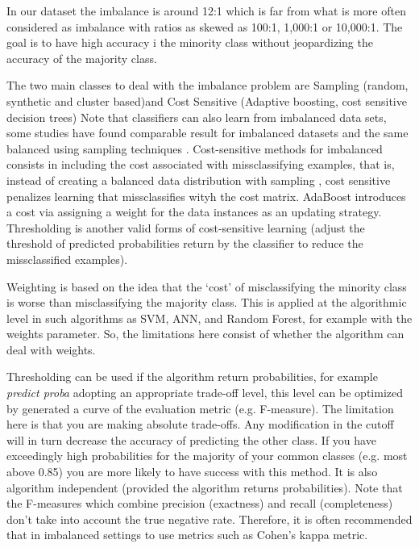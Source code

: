 \documentclass[11pt]{article}
\begin{document}
In our dataset the imbalance is around 12:1 which is far from what is more often considered as imbalance with ratios as skewed as 100:1, 1,000:1 or 10,000:1\cite{he2009learning}.
The goal is to have high accuracy i the minority class without jeopardizing  the accuracy of the majority class.

The two main classes to deal with the imbalance problem are Sampling (random, synthetic and cluster based)and Cost Sensitive (Adaptive boosting, cost sensitive decision trees) 
Note that classifiers can also learn from imbalanced data sets, some studies have found comparable result for imbalanced datasets and the same balanced using sampling techniques \cite{japkowicz2002class}.
Cost-sensitive methods for imbalanced consists in including the cost associated with missclassifying examples, that is, instead of creating a balanced data distribution with sampling , cost sensitive penalizes learning that missclassifies wityh the cost matrix. AdaBoost introduces a cost via assigning a weight for the data instances as an updating strategy. Thresholding is another valid forms of cost-sensitive learning (adjust the threshold of predicted probabilities return by the classifier to reduce the missclassified examples).

Weighting is based on the idea that the ‘cost’ of misclassifying the minority class is worse than misclassifying the majority  class. This is applied at the algorithmic level in such algorithms as SVM, ANN, and Random Forest, for example with the weights parameter. So, the limitations here consist of whether the algorithm can deal with weights.


Thresholding can be used if the algorithm return probabilities, for example \textit{predict proba} adopting an appropriate trade-off level, this level can be optimized by generated a curve of the evaluation metric (e.g. F-measure). The limitation here is that you are making absolute trade-offs. Any modification in the cutoff will in turn decrease the accuracy of predicting the other class. If you have exceedingly high probabilities for the majority of your common classes (e.g. most above 0.85) you are more likely to have success with this method. It is also algorithm independent (provided the algorithm returns probabilities).
Note that the F-measures which combine precision (exactness) and recall (completeness) don’t take into account the true negative rate. Therefore, it is often recommended that in imbalanced settings to use metrics such as Cohen’s kappa metric.
\end{document}
